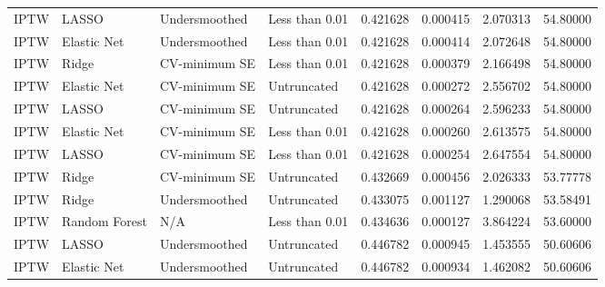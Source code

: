 \begin{longtable}[l]{llllllll}
IPTW & LASSO & Undersmoothed & Less than 0.01 & 0.421628 & 0.000415 & 2.070313 & 54.80000\\
IPTW & Elastic Net & Undersmoothed & Less than 0.01 & 0.421628 & 0.000414 & 2.072648 & 54.80000\\
IPTW & Ridge & CV-minimum SE & Less than 0.01 & 0.421628 & 0.000379 & 2.166498 & 54.80000\\
IPTW & Elastic Net & CV-minimum SE & Untruncated & 0.421628 & 0.000272 & 2.556702 & 54.80000\\
IPTW & LASSO & CV-minimum SE & Untruncated & 0.421628 & 0.000264 & 2.596233 & 54.80000\\
IPTW & Elastic Net & CV-minimum SE & Less than 0.01 & 0.421628 & 0.000260 & 2.613575 & 54.80000\\
IPTW & LASSO & CV-minimum SE & Less than 0.01 & 0.421628 & 0.000254 & 2.647554 & 54.80000\\
IPTW & Ridge & CV-minimum SE & Untruncated & 0.432669 & 0.000456 & 2.026333 & 53.77778\\
IPTW & Ridge & Undersmoothed & Untruncated & 0.433075 & 0.001127 & 1.290068 & 53.58491\\
IPTW & Random Forest & N/A & Less than 0.01 & 0.434636 & 0.000127 & 3.864224 & 53.60000\\
IPTW & LASSO & Undersmoothed & Untruncated & 0.446782 & 0.000945 & 1.453555 & 50.60606\\
IPTW & Elastic Net & Undersmoothed & Untruncated & 0.446782 & 0.000934 & 1.462082 & 50.60606\\
\bottomrule
\end{longtable}
